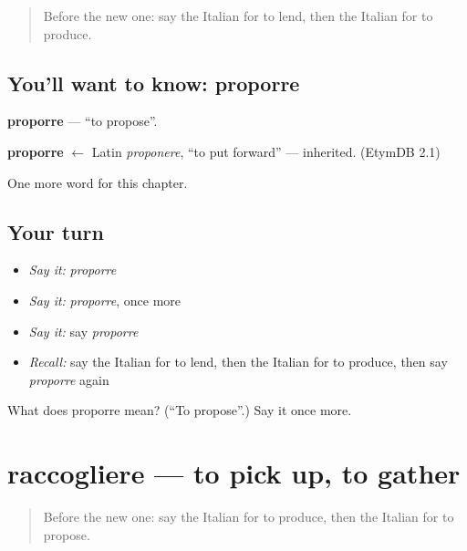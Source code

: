 \label{lesson:IT-C210-proporre}



\begin{quote}
Before the new one: say the Italian for to lend, then the Italian for to produce.
\end{quote}

\subsection*{You'll want to know: proporre}
\textbf{proporre} — \textquotedblleft{}to propose\textquotedblright{}.

\begin{cousinweb}
\textbf{proporre} $\leftarrow$ Latin \emph{proponere}, \textquotedblleft{}to put forward\textquotedblright{} — inherited. (EtymDB 2.1)
\end{cousinweb}

\begin{grammarlens}[title={What you've built}]
One more word for this chapter.
\end{grammarlens}

\subsection*{Your turn}
\begin{itemize}
\raggedright
  \item \emph{Say it:} \emph{proporre}
  \item \emph{Say it:} \emph{proporre}, once more
  \item \emph{Say it:} say \emph{proporre}
  \item \emph{Recall:} say the Italian for to lend, then the Italian for to produce, then say \emph{proporre} again
\end{itemize}

\begin{tcolorbox}[breakable,colback=teal!4,colframe=teal!35!black,title={Before you move on}]
What does proporre mean? (\textquotedblleft{}To propose\textquotedblright{}.) Say it once more.
\end{tcolorbox}
\section[raccogliere]{raccogliere — to pick up, to gather}

\label{lesson:IT-C210-raccogliere}



\begin{quote}
Before the new one: say the Italian for to produce, then the Italian for to propose.
\end{quote}

